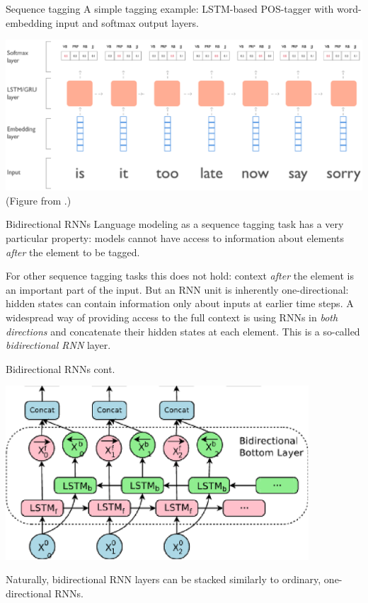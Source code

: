\documentclass[style=upen, size=14pt]{powerdot}
\newcommand{\gold}{\color{arany}}
\theoremstyle{definition}
\begin{document}
\begin{slide}{Sequence tagging}
  A simple tagging example: LSTM-based POS-tagger with word-embedding input and
  softmax output layers.
  \begin{center}
    \includegraphics[width=1\textwidth]{figures/rnn_sequence_tagging.eps}
    \footnotesize{(Figure from \cite{falcon2018taming}.)}
  \end{center}
\end{slide}

\begin{slide}{Bidirectional RNNs}
  Language modeling as a sequence tagging task has a very particular property:
  models cannot have access to information about elements \emph{after} the
  element to be tagged.\bigskip

  For other sequence tagging tasks this does not hold: context \emph{after} the
  element is an important part of the input. But an RNN unit is inherently
  one-directional: hidden states can contain information only about inputs at
  earlier time steps. A widespread way of providing access to the full context
  is using RNNs in \emph{both directions} and concatenate their hidden states at
  each element. This is a so-called \emph{\gold bidirectional RNN} layer.
\end{slide}

\begin{slide}[toc=]{Bidirectional RNNs cont.}
    \begin{center}
    \includegraphics[width=0.85\textwidth]{figures/birnn.eps}
  \end{center}
  Naturally, bidirectional RNN layers can be stacked similarly to ordinary,
  one-directional RNNs.
\end{slide}
\end{document}
